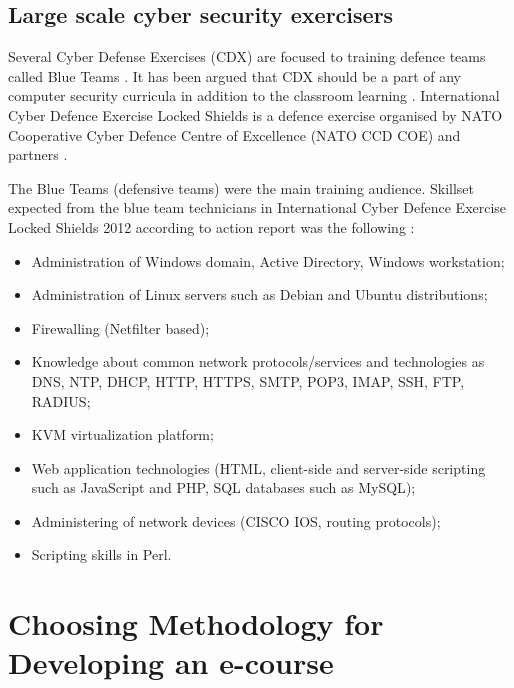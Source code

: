 \subsection{Large scale cyber security exercisers}
Several Cyber Defense Exercises (\gls{CDX}) are focused to training defence teams called Blue Teams \citep{website:NATO_CCD_COE,schepens_CDX}. It has been argued that \gls{CDX} should be a part of  any computer security curricula in addition to the classroom learning \citep{adams_CDX_curricula}. International Cyber Defence Exercise Locked Shields is a defence exercise organised by NATO Cooperative Cyber Defence Centre of Excellence (\gls{NATO CCD COE}) and partners  \citep{website:NATO_CCD_COE}. 

The Blue Teams (defensive teams) were the main training audience.
Skillset expected from the blue team technicians in International Cyber Defence Exercise Locked Shields 2012 according to action report was the following \citep{website:NATO_CCD_COE}:
\begin{itemize}
\item Administration of Windows domain, Active Directory, Windows workstation;
\item Administration of Linux servers such as Debian and Ubuntu distributions;
\item Firewalling (Netfilter based);
\item Knowledge about common network protocols/services and technologies as \gls{DNS}, \gls{NTP}, \gls{DHCP}, \gls{HTTP}, \gls{HTTPS}, \gls{SMTP}, \gls{POP3}, \gls{IMAP}, \gls{SSH}, \gls{FTP}, \gls{RADIUS};
\item \gls{KVM} virtualization platform;
\item Web application technologies (\gls{HTML}, client-side and server-side scripting
such as JavaScript and \gls{PHP}, \gls{SQL} databases such as \gls{MySQL});
\item Administering of network devices (CISCO IOS, routing protocols);
\item Scripting skills in Perl.
\end{itemize}

%

\section{Choosing Methodology for Developing an e-course}

